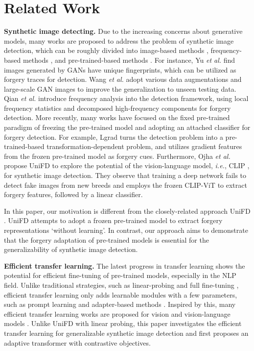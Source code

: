\documentclass[10pt,twocolumn,letterpaper]{article}
\begin{document}
\section{Related Work}
\noindent \textbf{Synthetic image detecting.}
Due to the increasing concerns about generative models, many works are proposed to address the problem of synthetic image detection, which can be roughly divided into image-based methods \cite{marra2019gans,rossler2019faceforensics,zhao2021learning,wang2023dire}, frequency-based methods \cite{frank2020leveraging,jeong2022bihpf,jeong2022frepgan}, and pre-trained-based methods \cite{tan2023learning,ojha2023towards}.
For instance, Yu {\em et al.} \cite{yu2019attributing} find images generated by GANs have unique fingerprints, which can be utilized as forgery traces for detection. Wang {\em et al.} \cite{wang2020cnn} adopt various data augmentations and large-scale GAN images to improve the generalization to unseen testing data. Qian {\em et al.} \cite{qian2020thinking} introduce frequency analysis into the detection framework, using local frequency statistics and decomposed high-frequency components for forgery detection. 
More recently, many works have focused on the fixed pre-trained paradigm of freezing the pre-trained model and adopting an attached classifier for forgery detection. 
For example, Lgrad \cite{tan2023learning} turns the detection problem into a pre-trained-based transformation-dependent problem, and utilizes gradient features from the frozen pre-trained model as forgery cues. 
Furthermore, Ojha {\em et al.} \cite{ojha2023towards} propose UniFD to explore the potential of the vision-language model, {\em i.e.}, CLIP \cite{radford2021learning}, for synthetic image detection. They observe that training a deep network fails to detect fake images from new breeds and employs the frozen CLIP-ViT \cite{dosovitskiy2020image,radford2021learning} to extract forgery features, followed by a linear classifier.

In this paper, our motivation is different from the closely-related approach UniFD \cite{ojha2023towards}. UniFD attempts to adopt a frozen pre-trained model to extract forgery representations `without learning'. In contrast, our approach aims to demonstrate that the forgery adaptation of pre-trained models is essential for the generalizability of synthetic image detection.

\noindent \textbf{Efficient transfer learning.}
The latest progress in transfer learning shows the potential for efficient fine-tuning of pre-trained models, especially in the NLP field. Unlike traditional strategies, such as linear-probing \cite{he2022masked} and full fine-tuning \cite{zhuang2021comprehensive}, efficient transfer learning only adds learnable modules with a few parameters, such as prompt learning \cite{lester2021power} and adapter-based methods \cite{houlsby2019parameter,hu2021lora}.
Inspired by this, many efficient transfer learning works are proposed for vision \cite{jia2022visual,chen2022adaptformer} and vision-language models \cite{zhou2022conditional,zhou2022learning}.
Unlike UniFD \cite{ojha2023towards} with linear probing, this paper investigates the efficient transfer learning for generalizable synthetic image detection and first proposes an adaptive transformer with contrastive objectives.
\end{document}
